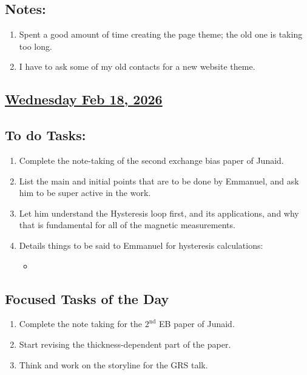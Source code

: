 \subsection*{Notes:}
\begin{enumerate}
    \item Spent a good amount of time creating the page theme; the old one is taking too long. 
    \item I have to ask some of my old contacts for a new website theme.
\end{enumerate}
\subsection*{\underline{Wednesday Feb 18, 2026} }
\subsection*{To do Tasks:}
\begin{enumerate}
    \item Complete the note-taking of the second exchange bias paper of Junaid. \cmark
    \item List the main and initial points that are to be done by Emmanuel, and ask him to be super active in the work. 
    \item Let him understand the Hysteresis loop first, and its applications, and why that is fundamental for all of the magnetic measurements.
    \item Details things to be said to Emmanuel for hysteresis calculations:
    \begin{itemize}
        \item 
    \end{itemize}
\end{enumerate}
\subsection*{Focused Tasks of the Day}
\begin{enumerate}[\ding{52}]  %
    \item Complete the note taking for the $2^{\mathrm{nd}}$ EB paper of Junaid.\cmark
    \item Start revising the thickness-dependent part of the paper.
    \item Think and work on the storyline for the GRS talk.
\end{enumerate}
